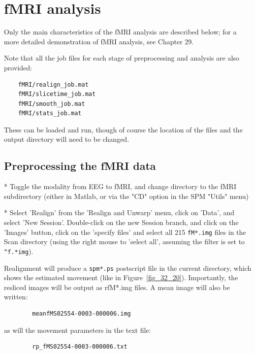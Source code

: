 \section{fMRI analysis \label{fMRI}}

Only the main characteristics of the fMRI analysis are described below; for a more detailed demonstration of fMRI analysis, see Chapter 29.

Note that all the job files for each stage of preprocessing and analysis are also provided:
\begin{verbatim}
    fMRI/realign_job.mat
    fMRI/slicetime_job.mat
    fMRI/smooth_job.mat
    fMRI/stats_job.mat
\end{verbatim}
These can be loaded and run, though of course the location of the files and the output directory will need to be changed.

\subsection{Preprocessing the fMRI data}

* Toggle the modality from EEG to fMRI, and change directory to the fMRI subdirectory (either in Matlab, or via the "CD" option in the SPM "Utils" menu)

* Select 'Realign' from the 'Realign and Unwarp' menu, click on 'Data', and select 'New Session'. Double-click on the new Session branch, and click on the 'Images' button, click on the 'specify files' and select all 215 \verb!fM*.img! files in the Scan directory (using the right mouse to 'select all', assuming the filter is set to \verb!^f.*img!).

Realignment will produce a \verb!spm*.ps! postscript file in the current directory, which shows the estimated movement (like in Figure~\ref{fig_32_20}). Importantly, the resliced images will be output as rfM*.img files. A mean image will also be written:
\begin{verbatim}
        meanfMS02554-0003-000006.img
\end{verbatim}
as will the movement parameters in the text file:
\begin{verbatim}
        rp_fMS02554-0003-000006.txt
\end{verbatim}

